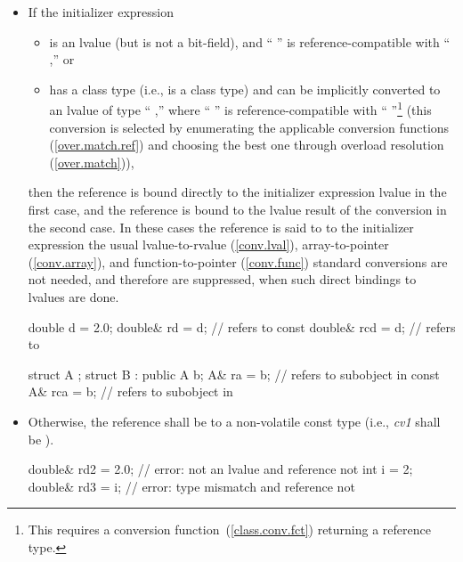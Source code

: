 \begin{itemize}
\item
If the initializer expression

\begin{itemize}
\item
is an lvalue (but is not a
bit-field), and
`` '' is reference-compatible with
`` ,'' or
\item
has a class type (i.e.,
is a class type) and can be implicitly converted
to an lvalue of type `` ,'' where
`` '' is reference-compatible with
`` ''\footnote{This requires a conversion
function~(\ref{class.conv.fct}) returning a reference type.}
(this conversion is selected by enumerating the applicable conversion
functions (\ref{over.match.ref}) and choosing the best one through overload
resolution (\ref{over.match})),
\end{itemize}
then the reference is bound directly to the initializer expression lvalue in the
first case, and the reference is bound to the lvalue result of the conversion
in the second case. In these cases the reference is said to
 to the initializer expression
\enternote
the usual lvalue-to-rvalue (\ref{conv.lval}), array-to-pointer
(\ref{conv.array}), and function-to-pointer (\ref{conv.func}) standard
conversions are not needed, and therefore are suppressed, when such
direct bindings to lvalues are done.
\exitnote\\
\enterexample

\begin{codeblock}
double d = 2.0;
double& rd = d;                 //  refers to 
const double& rcd = d;          //  refers to 

struct A { };
struct B : public A { } b;
A& ra = b;                      //  refers to  subobject in 
const A& rca = b;               //  refers to  subobject in 
\end{codeblock}
\exitexampleb

\item
Otherwise, the reference shall be to a non-volatile
const type (i.e.,
\textit{cv1}
shall be
).
\enterexample

\begin{codeblock}
double& rd2 = 2.0;              // error: not an lvalue and reference not 
int  i = 2;
double& rd3 = i;                // error: type mismatch and reference not 
\end{codeblock}
\exitexampleb


\end{itemize}
